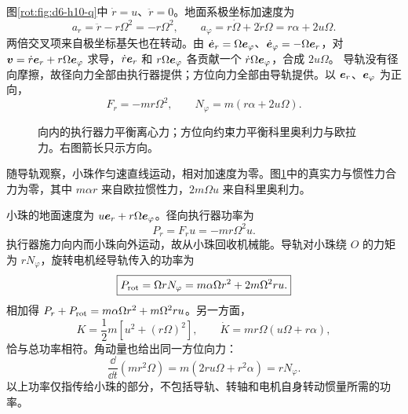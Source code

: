\begin{solution}
图\ref{rot:fig:d6-h10-q}中 $\dot r=u$、$\ddot r=0$。地面系极坐标加速度为
\[
a_r=\ddot r-r\Omega^2=-r\Omega^2,
\qquad
a_\varphi=r\dot\Omega+2\dot r\Omega=r\alpha+2u\Omega.
\]
两倍交叉项来自极坐标基矢也在转动。由 $\dot{\bm{e}}_r=\Omega\bm{e}_\varphi$、$\dot{\bm{e}}_\varphi=-\Omega\bm{e}_r$，对 $\bm{v}=\dot r\bm{e}_r+r\Omega\bm{e}_\varphi$ 求导，$\dot r\bm{e}_r$ 和 $r\Omega\bm{e}_\varphi$ 各贡献一个 $\dot r\Omega\bm{e}_\varphi$，合成 $2u\Omega$。
导轨没有径向摩擦，故径向力全部由执行器提供；方位向力全部由导轨提供。以 $\bm{e}_r$、$\bm{e}_\varphi$ 为正向，
\[
\boxed{F_r=-mr\Omega^2,\qquad N_\varphi=m(r\alpha+2u\Omega).}
\]
\begin{figure}[H]\centering
{}
\caption{向内的执行器力平衡离心力；方位向约束力平衡科里奥利力与欧拉力。右图箭长只示方向。}\label{rot:fig:d6-h10-s}
\end{figure}
随导轨观察，小珠作匀速直线运动，相对加速度为零。图\ref{rot:fig:d6-h10-s}中的真实力与惯性力合力为零，其中 $m\alpha r$ 来自欧拉惯性力，$2m\Omega u$ 来自科里奥利力。

小珠的地面速度为 $u\bm{e}_r+r\Omega\bm{e}_\varphi$。径向执行器功率为
\[
\boxed{P_r=F_ru=-mr\Omega^2u.}
\]
执行器施力向内而小珠向外运动，故从小珠回收机械能。导轨对小珠绕 $O$ 的力矩为 $rN_\varphi$，旋转电机经导轨传入的功率为
\[
\boxed{P_{\rm rot}=\Omega rN_\varphi
=m\alpha\Omega r^2+2m\Omega^2ru.}
\]
相加得 $P_r+P_{\rm rot}=m\alpha\Omega r^2+m\Omega^2ru$。另一方面，
\[
K=\frac12m[u^2+(r\Omega)^2],\qquad
\dot K=mr\Omega(u\Omega+r\alpha),
\]
恰与总功率相符。角动量也给出同一方位向力：
\[
\frac{\dd}{\dd t}(mr^2\Omega)=m(2ru\Omega+r^2\alpha)=rN_\varphi.
\]
以上功率仅指传给小珠的部分，不包括导轨、转轴和电机自身转动惯量所需的功率。
\end{solution}


